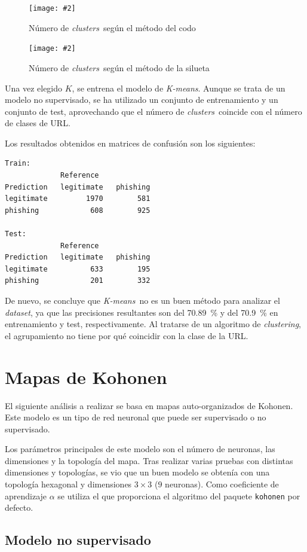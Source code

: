 \documentclass[12pt, a4paper]{article}
\renewcommand{\textit}{\textsl}
\newcommand{\figcaption}[4][H]{
  \begin{figure}[#1]
    \centering
    \texttt{[image: \#2]}
    \caption{#3}
    \label{fig:#2}
  \end{figure}
}
\newcommand*{\clusters}{\textit{clusters}}
\newcommand*{\clustering}{\textit{clustering}}
\newcommand*{\dataset}{\textit{dataset}}
\newcommand*{\kmeans}{\textit{K-means}}
\begin{document}
      \figcaption{elbow.png}{Número de \clusters\ según el método del codo}{1}

      \figcaption{silhouette.png}{Número de \clusters\ según el método de la silueta}{1}

      \newpage

      Una vez elegido $K$, se entrena el modelo de \kmeans. Aunque se trata de un modelo no supervisado, se ha utilizado un conjunto de entrenamiento y un conjunto de test, aprovechando que el número de \clusters\ coincide con el número de clases de URL.

      Los resultados obtenidos en matrices de confusión son los siguientes:

      \begin{verbatim}
Train:
             Reference
Prediction   legitimate   phishing
legitimate         1970        581
phishing            608        925

Test:
             Reference
Prediction   legitimate   phishing
legitimate          633        195
phishing            201        332
      \end{verbatim}

      De nuevo, se concluye que \kmeans\ no es un buen método para analizar el \dataset, ya que las precisiones resultantes son del \SI{70.89}{\percent} y del \SI{70.9}{\percent} en entrenamiento y test, respectivamente. Al tratarse de un algoritmo de \clustering, el agrupamiento no tiene por qué coincidir con la clase de la URL.

  \section{Mapas de Kohonen}

    El siguiente análisis a realizar se basa en mapas auto-organizados de Kohonen. Este modelo es un tipo de red neuronal que puede ser supervisado o no supervisado.

    Los parámetros principales de este modelo son el número de neuronas, las dimensiones y la topología del mapa. Tras realizar varias pruebas con distintas dimensiones y topologías, se vio que un buen modelo se obtenía con una topología hexagonal y dimensiones $3 \times 3$ ($9$ neuronas). Como coeficiente de aprendizaje $\alpha$ se utiliza el que proporciona el algoritmo del paquete \texttt{kohonen} por defecto.

    \subsection{Modelo no supervisado}
\end{document}
